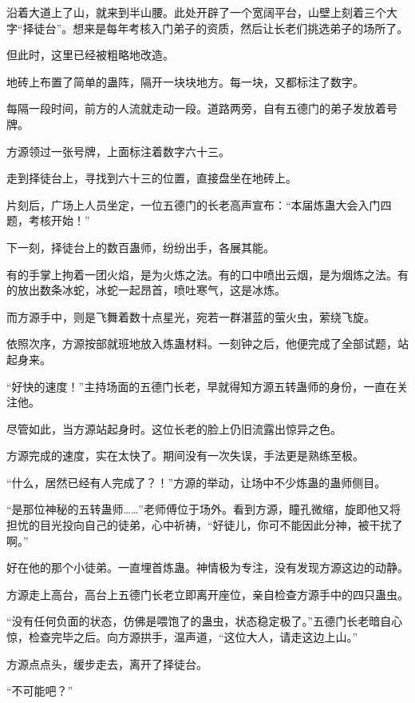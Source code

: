 
\begin{this_body}

沿着大道上了山，就来到半山腰。此处开辟了一个宽阔平台，山壁上刻着三个大字“择徒台”。想来是每年考核入门弟子的资质，然后让长老们挑选弟子的场所了。

但此时，这里已经被粗略地改造。

地砖上布置了简单的蛊阵，隔开一块块地方。每一块，又都标注了数字。

每隔一段时间，前方的人流就走动一段。道路两旁，自有五德门的弟子发放着号牌。

方源领过一张号牌，上面标注着数字六十三。

走到择徒台上，寻找到六十三的位置，直接盘坐在地砖上。

片刻后，广场上人员坐定，一位五德门的长老高声宣布：“本届炼蛊大会入门四题，考核开始！”

下一刻，择徒台上的数百蛊师，纷纷出手，各展其能。

有的手掌上拘着一团火焰，是为火炼之法。有的口中喷出云烟，是为烟炼之法。有的放出数条冰蛇，冰蛇一起昂首，喷吐寒气，这是冰炼。

而方源手中，则是飞舞着数十点星光，宛若一群湛蓝的萤火虫，萦绕飞旋。

依照次序，方源按部就班地放入炼蛊材料。一刻钟之后，他便完成了全部试题，站起身来。

“好快的速度！”主持场面的五德门长老，早就得知方源五转蛊师的身份，一直在关注他。

尽管如此，当方源站起身时。这位长老的脸上仍旧流露出惊异之色。

方源完成的速度，实在太快了。期间没有一次失误，手法更是熟练至极。

“什么，居然已经有人完成了？！”方源的举动，让场中不少炼蛊的蛊师侧目。

“是那位神秘的五转蛊师……”老师傅位于场外。看到方源，瞳孔微缩，旋即他又将担忧的目光投向自己的徒弟，心中祈祷，“好徒儿，你可不能因此分神，被干扰了啊。”

好在他的那个小徒弟。一直埋首炼蛊。神情极为专注，没有发现方源这边的动静。

方源走上高台，高台上五德门长老立即离开座位，亲自检查方源手中的四只蛊虫。

“没有任何负面的状态，仿佛是喂饱了的蛊虫，状态稳定极了。”五德门长老暗自心惊，检查完毕之后。向方源拱手，温声道，“这位大人，请走这边上山。”

方源点点头，缓步走去，离开了择徒台。

“不可能吧？”


\end{this_body}
